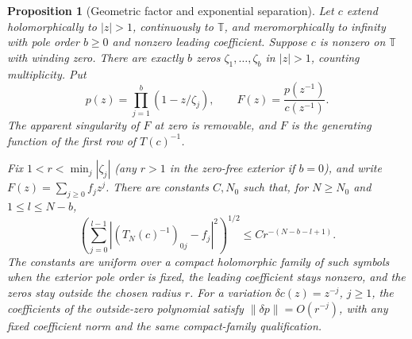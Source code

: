 \documentclass[11pt]{article}
\newtheorem{proposition}{Proposition}[section]
\newcommand{\T}{\mathbb T}
\begin{document}
\begin{proposition}[Geometric factor and exponential separation]
\label{prop:outside-factor}
Let $c$ extend holomorphically to $|z|>1$, continuously to $\T$, and
meromorphically to infinity with pole order $b\ge0$ and nonzero leading
coefficient. Suppose $c$ is nonzero on $\T$ with winding zero.
There are exactly $b$ zeros $\zeta_1,\ldots,\zeta_b$ in $|z|>1$,
counting multiplicity. Put
\[
 p(z)=\prod_{j=1}^b(1-z/\zeta_j),\qquad
 F(z)=\frac{p(z^{-1})}{c(z^{-1})}.
\]
The apparent singularity of $F$ at zero is removable, and $F$ is the
generating function of the first row of $T(c)^{-1}$.

Fix $1<r<\min_j|\zeta_j|$ (any $r>1$ in the zero-free exterior if
$b=0$), and write $F(z)=\sum_{j\ge0}f_jz^j$.
There are constants $C,N_0$ such that, for $N\ge N_0$ and
$1\le l\le N-b$,
\begin{equation}\label{eq:low-row-exponential}
 \left(\sum_{j=0}^{l-1}|(T_N(c)^{-1})_{0j}-f_j|^2\right)^{1/2}
 \le C r^{-(N-b-l+1)}.
\end{equation}
The constants are uniform over a compact holomorphic family of such
symbols when the exterior pole order is fixed, the leading coefficient
stays nonzero, and the zeros stay outside the chosen radius $r$.
For a variation $\delta c(z)=z^{-j}$, $j\ge1$, the coefficients of
the outside-zero polynomial satisfy $\|\delta p\|=O(r^{-j})$, with
any fixed coefficient norm and the same compact-family qualification.
\end{proposition}
\end{document}
